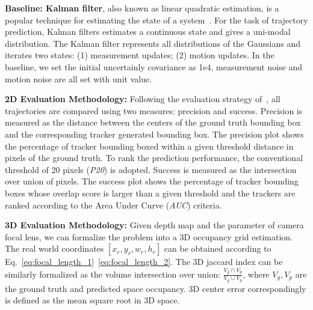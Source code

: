 \documentclass[10pt,twocolumn,letterpaper]{article}
\begin{document}
\vspace{\baselineskip}
\noindent \textbf{Baseline: Kalman filter}, also known as linear quadratic estimation, is a popular technique for estimating the state of a system~\cite{Thrun2016}. For the task of trajectory prediction, Kalman filters estimates a continuous state and gives a uni-modal distribution. The Kalman filter represents all distributions of the Gaussians and iterates two states: (1) measurement updates; (2) motion updates. In the baseline, we set
the initial uncertainly covariance as 1e4, measurement noise and motion noise are all set with unit value.


\noindent \textbf{2D Evaluation Methodology:}
Following the evaluation strategy  of~\cite{wu2013online}, all trajectories are compared using two measures: precision and success. Precision is measured as the distance between the centers of the ground truth bounding box and the corresponding tracker generated bounding box. The precision plot shows the percentage of tracker bounding boxed within a given threshold distance in pixels of the ground truth. To rank the prediction performance, the conventional threshold of 20 pixels (\emph{P20}) is adopted. Success is measured as the intersection over union of pixels. The success plot shows the percentage of tracker bounding boxes whose overlap score is larger than a given threshold and the trackers are ranked according to the Area Under Curve (\emph{AUC}) criteria.

\vspace{\baselineskip}
\noindent \textbf{3D Evaluation Methodology:} Given depth map and the parameter of camera focal lens, we can formalize the problem into a 3D occupancy grid estimation. The real world coordinates $[x_r, y_r, w_r, h_r]$ can be obtained according to Eq.~\ref{eq:focal_length_1}~\ref{eq:focal_length_2}. The 3D jaccard index can be similarly formalized as the volume intersection over union: $\frac{V_g \cap V_p}{V_g \cup V_p}$, where $V_g, V_p$ are the ground truth and predicted space occupancy. 3D center error correspondingly is defined as the mean square root in 3D space.
\end{document}
